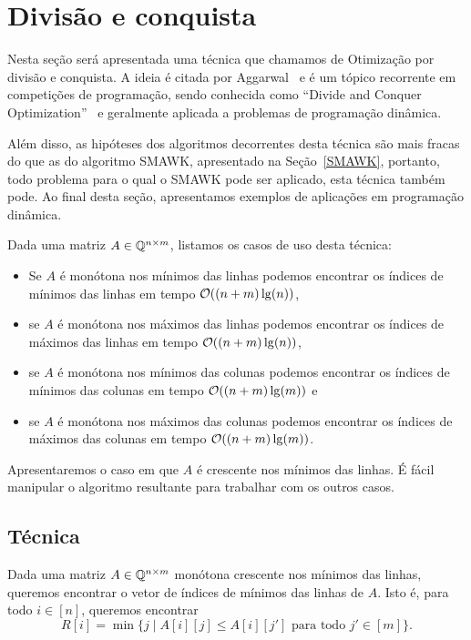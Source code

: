 \section{Divisão e conquista}
\label{DivConq}


Nesta seção será apresentada uma técnica que chamamos de Otimização por divisão e conquista. A ideia é citada por Aggarwal~\cite{Aggarwal:1987} e é um tópico recorrente em competições de programação, sendo conhecida como ``Divide and Conquer Optimization''~\cite{Quora:DivConq,CF:Optm} e geralmente aplicada a problemas de programação dinâmica. 

Além disso, as hipóteses dos algoritmos decorrentes desta técnica são mais fracas do que as do algoritmo SMAWK, apresentado na Seção~\ref{SMAWK}, portanto, todo problema para o qual o SMAWK pode ser aplicado, esta técnica também pode. Ao final desta seção, apresentamos exemplos de aplicações em programação dinâmica.  

Dada uma matriz $A \in \mathbb{Q}^{n \times m}$, listamos os casos de uso desta técnica:
\begin{itemize}
    \item Se $A$ é monótona nos mínimos das linhas podemos encontrar os índices de mínimos das linhas em tempo $\mathcal{O}((n+m)\lg(n))$, 
    \item se $A$ é monótona nos máximos das linhas podemos encontrar os índices de máximos das linhas em tempo $\mathcal{O}((n+m)\lg(n))$, 
    \item se $A$ é monótona nos mínimos das colunas podemos encontrar os índices de mínimos das colunas em tempo $\mathcal{O}((n+m)\lg(m))$ e 
    \item se $A$ é monótona nos máximos das colunas podemos encontrar os índices de máximos das colunas em tempo $\mathcal{O}((n+m)\lg(m))$.
\end{itemize}

Apresentaremos o caso em que $A$ é crescente nos mínimos das linhas. É fácil manipular o algoritmo resultante para trabalhar com os outros casos.


\subsection{Técnica}
Dada uma matriz $A \in \mathbb{Q}^{n \times m}$ monótona crescente nos mínimos das linhas, queremos encontrar o vetor de índices de mínimos das linhas de $A$. Isto é, para todo $i \in [n]$, queremos encontrar
$$ R[i] = \min\{j \mid A[i][j] \leq A[i][j'] \text{ para todo } j' \in [m]\} \text{.}$$  

